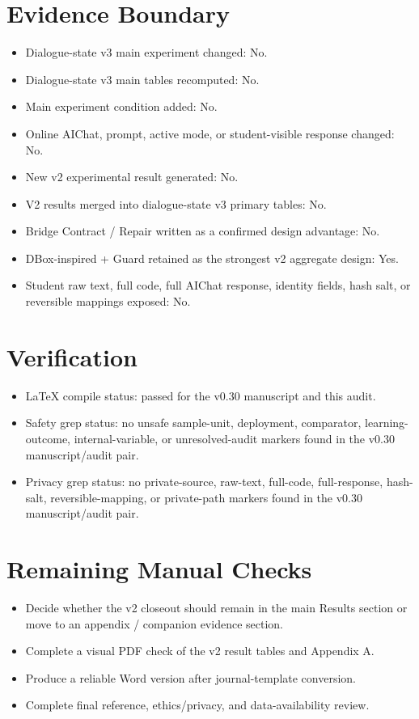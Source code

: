 \documentclass[11pt]{article}
\begin{document}
\section{Evidence Boundary}

\begin{itemize}
  \item Dialogue-state v3 main experiment changed: No.
  \item Dialogue-state v3 main tables recomputed: No.
  \item Main experiment condition added: No.
  \item Online AIChat, prompt, active mode, or student-visible response changed: No.
  \item New v2 experimental result generated: No.
  \item V2 results merged into dialogue-state v3 primary tables: No.
  \item Bridge Contract / Repair written as a confirmed design advantage: No.
  \item DBox-inspired + Guard retained as the strongest v2 aggregate design: Yes.
  \item Student raw text, full code, full AIChat response, identity fields, hash salt, or reversible mappings exposed: No.
\end{itemize}

\section{Verification}

\begin{itemize}
  \item LaTeX compile status: passed for the v0.30 manuscript and this audit.
  \item Safety grep status: no unsafe sample-unit, deployment, comparator, learning-outcome, internal-variable, or unresolved-audit markers found in the v0.30 manuscript/audit pair.
  \item Privacy grep status: no private-source, raw-text, full-code, full-response, hash-salt, reversible-mapping, or private-path markers found in the v0.30 manuscript/audit pair.
\end{itemize}

\section{Remaining Manual Checks}

\begin{itemize}
  \item Decide whether the v2 closeout should remain in the main Results section or move to an appendix / companion evidence section.
  \item Complete a visual PDF check of the v2 result tables and Appendix A.
  \item Produce a reliable Word version after journal-template conversion.
  \item Complete final reference, ethics/privacy, and data-availability review.
\end{itemize}
\end{document}
